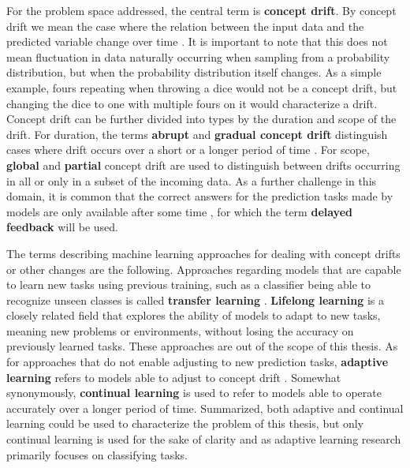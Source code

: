 For the problem space addressed, the central term is \textbf{concept drift}. By concept drift we mean the case where the relation between the input
data and the predicted variable change over time \cite{conceptdriftsurvey} \cite{schlimmerIncrementalLearningNoisy1986}. It is important to note that this does not mean fluctuation in data naturally occurring when sampling from a probability distribution, but when the probability distribution itself changes. As a simple example, fours repeating when throwing a dice would not be a concept drift, but changing the dice to one with multiple fours on it would characterize a drift. Concept drift can be further divided into types by the duration and scope of the drift. For duration, the terms \textbf{abrupt} and \textbf{gradual concept drift} distinguish cases where drift occurs over a short or a longer period of time \cite{zliobaiteAdaptiveTrainingSet2010}. For scope, \textbf{global} and \textbf{partial} concept drift are used to distinguish between drifts occurring in all or only in a subset of the incoming data. As a further challenge in this domain, it is common that the correct answers for the prediction tasks made by models are only available after some time \cite{delayedlabelstreams}, for which the term  \textbf{delayed feedback} will be used. 

The terms describing machine learning approaches for dealing with concept drifts or other changes are the following. Approaches regarding models that are capable to learn new tasks using previous training, such as a classifier being able to recognize unseen classes is called \textbf{transfer learning} \cite{iotsurvey}. \textbf{Lifelong learning} is a closely related field that explores the ability of models to adapt to new tasks, meaning new problems or environments, without losing the accuracy on previously learned tasks.  These approaches are out of the scope of this thesis. As for approaches that do not enable adjusting to new prediction tasks, \textbf{adaptive learning} refers to models able to adjust to concept drift \cite{conceptdriftsurvey}. Somewhat synonymously, \textbf{continual learning} is used to refer to models able to operate accurately over a longer period of time. Summarized, both adaptive and continual learning could be used to characterize the problem of this thesis, but only continual learning is used for the sake of clarity and as adaptive learning research primarily focuses on classifying tasks.

